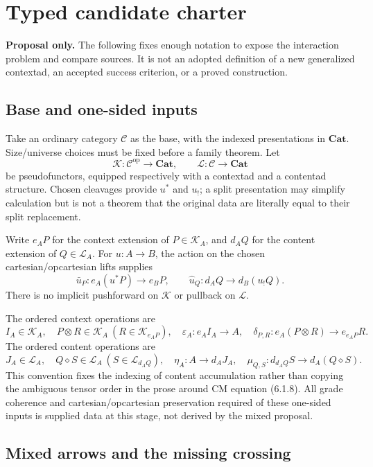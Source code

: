 \documentclass[11pt,a4paper]{article}
\newcommand{\Cat}{\mathbf{Cat}}
\newcommand{\op}{\mathrm{op}}
\newcommand{\C}{\mathcal C}
\newcommand{\K}{\mathcal K}
\newcommand{\Lcat}{\mathcal L}
\begin{document}
\section{Typed candidate charter}
\label{sec:charter}

\textbf{Proposal only.} The following fixes enough notation to expose the
interaction problem and compare sources. It is not an adopted definition of a
new generalized contextad, an accepted success criterion, or a proved construction.

\subsection{Base and one-sided inputs}

Take an ordinary category \(\C\) as the base, with the indexed presentations in
\(\Cat\). Size/universe choices must be fixed before a family theorem. Let
\[
 \K:\C^{\op}\longrightarrow\Cat,
 \qquad \Lcat:\C\longrightarrow\Cat
\]
be pseudofunctors, equipped respectively with a contextad and a contentad
structure. Chosen cleavages provide \(u^*\) and \(u_!\); a split presentation
may simplify calculation but is not a theorem that the original data are
literally equal to their split replacement.

Write \(e_A P\) for the context extension of \(P\in\K_A\), and \(d_A Q\)
for the content extension of \(Q\in\Lcat_A\). For \(u:A\to B\), the action
on the chosen cartesian/opcartesian lifts supplies
\[
 \bar u_P:e_A(u^*P)\longrightarrow e_B P,
 \qquad
 \widehat u_Q:d_AQ\longrightarrow d_B(u_!Q).
\]
There is no implicit pushforward on \(\K\) or pullback on \(\Lcat\).

The ordered context operations are
\[
 I_A\in\K_A,\quad P\otimes R\in\K_A\ (R\in\K_{e_AP}),\quad
 \varepsilon_A:e_AI_A\to A,\quad
 \delta_{P,R}:e_A(P\otimes R)\to e_{e_AP}R.
\]
The ordered content operations are
\[
 J_A\in\Lcat_A,\quad Q\diamond S\in\Lcat_A\ (S\in\Lcat_{d_AQ}),\quad
 \eta_A:A\to d_AJ_A,\quad
 \mu_{Q,S}:d_{d_AQ}S\to d_A(Q\diamond S).
\]
This convention fixes the indexing of content accumulation rather than copying
the ambiguous tensor order in the prose around CM equation (6.1.8).
All grade coherence and cartesian/opcartesian preservation required of these
one-sided inputs is supplied data at this stage, not derived by the mixed proposal.

\subsection{Mixed arrows and the missing crossing}
\end{document}
